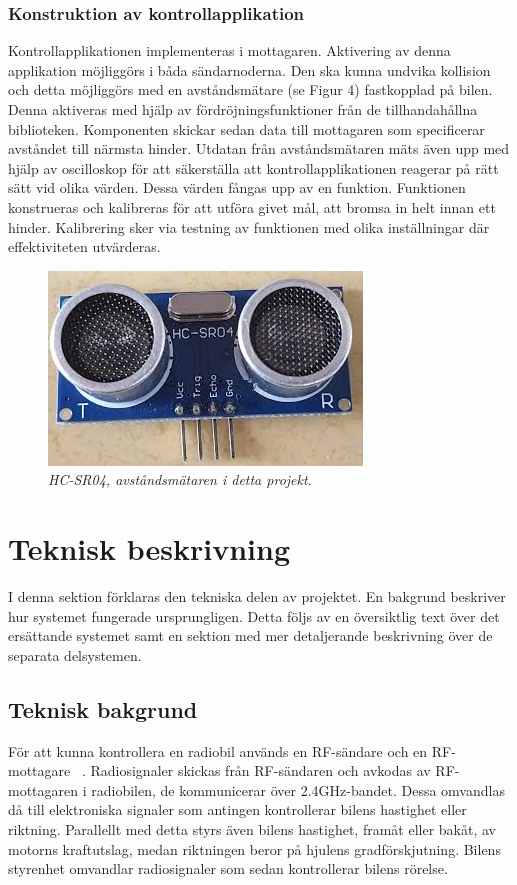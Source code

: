 \documentclass[a4paper]{article}
\begin{document}
\subsubsection{Konstruktion av kontrollapplikation}
Kontrollapplikationen implementeras i mottagaren. Aktivering av denna applikation möjliggörs i båda sändarnoderna. Den ska kunna undvika kollision och detta möjliggörs med en avståndsmätare (se Figur 4) fastkopplad på bilen. Denna aktiveras med hjälp av fördröjningsfunktioner från de tillhandahållna biblioteken. Komponenten skickar sedan data till mottagaren som specificerar avståndet till närmsta hinder. Utdatan från avståndsmätaren mäts även upp med hjälp av oscilloskop för att säkerställa att kontrollapplikationen reagerar på rätt sätt vid olika värden. Dessa värden fångas upp av en funktion. Funktionen konstrueras och kalibreras för att utföra givet mål, att bromsa in helt innan ett hinder. Kalibrering sker via testning av funktionen med olika inställningar där effektiviteten utvärderas. 


\begin{figure}[H]
\includegraphics[scale=0.6]{DistanceMeasurementFront.jpg}
\centering
\caption{\it HC-SR04, avståndsmätaren i detta projekt.}
\end{figure} 



\newpage
\section{Teknisk beskrivning}
I denna sektion förklaras den tekniska delen av projektet. En bakgrund beskriver hur systemet fungerade ursprungligen. Detta följs av en översiktlig text över det ersättande systemet samt en sektion med mer detaljerande beskrivning över de separata delsystemen.


\subsection{Teknisk bakgrund}
För att kunna kontrollera en radiobil används en RF-sändare och en RF-mottagare ~\cite{RCTechnique}. Radiosignaler skickas från RF-sändaren och avkodas av RF-mottagaren i radiobilen, de kommunicerar över 2.4GHz-bandet. Dessa omvandlas då till elektroniska signaler som antingen kontrollerar bilens hastighet eller riktning. Parallellt med detta styrs även bilens hastighet, framåt eller bakåt, av motorns kraftutslag, medan riktningen beror på hjulens gradförskjutning. Bilens styrenhet omvandlar radiosignaler som sedan kontrollerar bilens rörelse.
\end{document}
